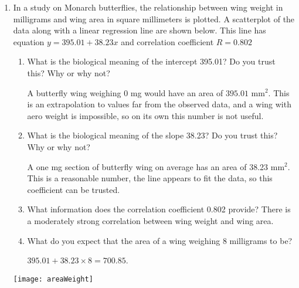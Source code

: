 \documentclass[12pt,fullpage]{amsart}
\begin{document}
\begin{enumerate}
  \vfill

\item In a study on Monarch butterflies, the relationship between wing weight in milligrams and wing area in square millimeters is plotted. A scatterplot of the data along with a linear regression line
  are shown below.  This line has equation $y = 395.01 + 38.23 x$ and
  correlation coefficient $R=0.802$
  \begin{enumerate}
  \item What is the biological meaning of the intercept 395.01?  Do
    you trust this?  Why or why not?

    {\color{red} A butterfly wing weighing 0 mg would have an area of $395.01$ mm$^2$. This is an extrapolation to values far from the observed data, and a wing with aero weight is impossible, so on its own this number is not useful.}
  \item What is the biological meaning of the slope 38.23?  Do
    you trust this?  Why or why not?

    {\color{red} A one mg section of butterfly wing on average has an area of 38.23  mm$^2$. This is a reasonable number, the line appears to fit the data, so this coefficient can be trusted.}
    \item What information does the correlation coefficient 0.802 provide?
{\color{red} There is a moderately strong correlation between wing weight and wing area.}
  \item What do you expect that the area of a wing weighing 8 milligrams to be?

    {\color{red}$395.01 + 38.23 \times 8=700.85$.} 
    
  \end{enumerate}
\texttt{[image: areaWeight]}





\end{enumerate}
\end{document}
